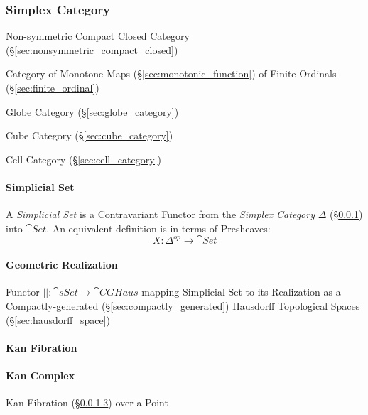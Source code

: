 \subsubsection{Simplex Category}\label{sec:simplex_category}

Non-symmetric Compact Closed Category
(\S\ref{sec:nonsymmetric_compact_closed})

Category of Monotone Maps (\S\ref{sec:monotonic_function}) of Finite
Ordinals (\S\ref{sec:finite_ordinal})

\fist Globe Category (\S\ref{sec:globe_category})

\fist Cube Category (\S\ref{sec:cube_category})

\fist Cell Category (\S\ref{sec:cell_category})



\paragraph{Simplicial Set}\label{sec:simplicial_set}\hfill

A \emph{Simplicial Set} is a Contravariant Functor from the
\emph{Simplex Category} $\Delta$ (\S\ref{sec:simplex_category}) into
$\cat{Set}$. An equivalent definition is in terms of Presheaves:
\[
  X: \Delta^{op} \rightarrow \cat{Set}
\]



\paragraph{Geometric Realization}\label{sec:geometric_realization}\hfill

Functor $|\dot| : \cat{sSet} \rightarrow \cat{CGHaus}$ mapping
Simplicial Set to its Realization as a Compactly-generated
(\S\ref{sec:compactly_generated}) Hausdorff Topological Spaces
(\S\ref{sec:hausdorff_space})



\paragraph{Kan Fibration}\label{sec:kan_fibration}\hfill

\paragraph{Kan Complex}\label{sec:kan_complex}\hfill

Kan Fibration (\S\ref{sec:kan_fibration}) over a Point


